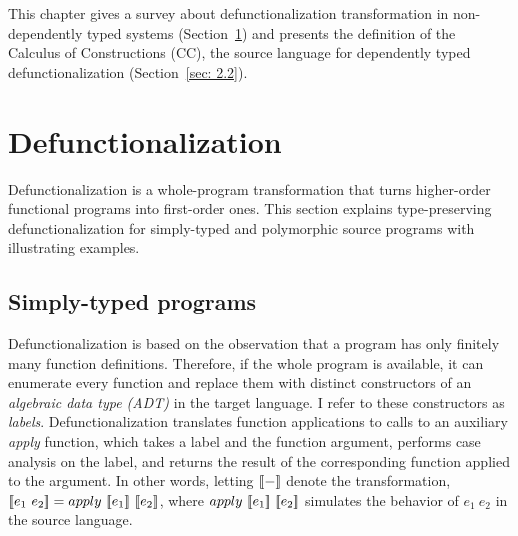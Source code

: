 
This chapter gives a survey about defunctionalization transformation in non-dependently typed systems (Section~\ref{sec: 2.1}) and presents the definition of the Calculus of Constructions (CC), the source language for dependently typed defunctionalization (Section~\ref{sec: 2.2}).

\section{Defunctionalization}
\label{sec: 2.1}

Defunctionalization is a whole-program transformation that turns higher-order functional programs into first-order ones. This section explains type-preserving defunctionalization for simply-typed and polymorphic source programs with illustrating examples.

\subsection{Simply-typed programs}

Defunctionalization is based on the observation that a program has only finitely many function definitions. Therefore, if the whole program is available, it can enumerate every function and replace them with distinct constructors of an \textit{algebraic data type (ADT)} in the target language. I refer to these constructors as \textit{labels}. Defunctionalization translates function applications to calls to an auxiliary \textit{apply} function, which takes a label and the function argument, performs case analysis on the label, and returns the result of the corresponding function applied to the argument. In other words, letting ${[\![ - ]\!]}$ denote the transformation, $ \bbracket{e_1\ e_2} = apply\ \bbracket{e_1}\ \bbracket{e_2} $, where $apply\ {[\![ e_1 ]\!]}\ {[\![ e_2 ]\!]}$ simulates the behavior of $e_1\ e_2$ in the source language.


